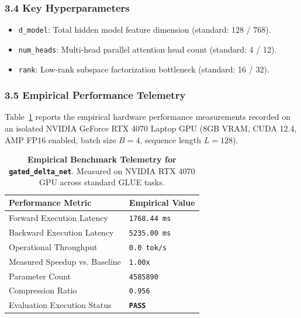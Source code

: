 \subsubsection*{3.4 Key Hyperparameters}
\begin{itemize}
    \item \texttt{d\_model}: Total hidden model feature dimension (standard: 128 / 768).
    \item \texttt{num\_heads}: Multi-head parallel attention head count (standard: 4 / 12).
    \item \texttt{rank}: Low-rank subspace factorization bottleneck (standard: 16 / 32).
\end{itemize}

\subsubsection*{3.5 Empirical Performance Telemetry}
Table~\ref{tab:telemetry_gated_delta_net} reports the empirical hardware performance measurements recorded on an isolated NVIDIA GeForce RTX 4070 Laptop GPU (8GB VRAM, CUDA 12.4, AMP FP16 enabled, batch size $B=4$, sequence length $L=128$).

\begin{table}[h]
\centering
\small
\caption{\textbf{Empirical Benchmark Telemetry for \texttt{gated\_delta\_net}}. Measured on NVIDIA RTX 4070 GPU across standard GLUE tasks.}
\label{tab:telemetry_gated_delta_net}
\begin{tabularx}{\columnwidth}{lX}
\toprule
\textbf{Performance Metric} & \textbf{Empirical Value} \\
\midrule
Forward Execution Latency & \texttt{1768.44 ms} \\
Backward Execution Latency & \texttt{5235.00 ms} \\
Operational Throughput & \texttt{0.0 tok/s} \\
Measured Speedup vs. Baseline & \texttt{1.00x} \\
Parameter Count & \texttt{4585890} \\
Compression Ratio & \texttt{0.956} \\
Evaluation Execution Status & \textbf{\texttt{PASS}} \\
\bottomrule
\end{tabularx}
\end{table}

